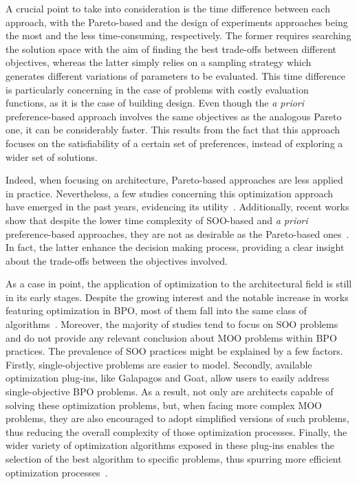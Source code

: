 	A crucial point to take into consideration is the time difference between each approach, with the Pareto-based and the design of experiments approaches being the most and the less time-consuming, respectively. The former requires searching the solution space with the aim of finding the best trade-offs between different objectives, whereas the latter simply relies on a sampling strategy which generates different variations of parameters to be evaluated. This time difference is particularly concerning in the case of problems with costly evaluation functions, as it is the case of building design. Even though the \textit{a priori} preference-based approach involves the same objectives as the analogous Pareto one, it can be considerably faster. This results from the fact that this approach focuses on the satisfiability of a certain set of preferences, instead of exploring a wider set of solutions.
	
	Indeed, when focusing on architecture, Pareto-based approaches are less applied in practice. Nevertheless, a few studies concerning this optimization approach have emerged in the past years, evidencing its utility~\cite{Evins2013,Hamdy2016}. Additionally, recent works show that despite the lower time complexity of \ac{SOO}-based and \textit{a priori} preference-based approaches, they are not as desirable as the Pareto-based ones~\cite{Attia2013,Cichocka2017SURVEY}. In fact, the latter enhance the decision making process, providing a clear insight about the trade-offs between the objectives involved. %

	As a case in point, the application of optimization to the architectural field is still in its early stages. Despite the growing interest and the notable increase in works featuring optimization in \ac{BPO}, most of them fall into the same class of algorithms~\cite{Evins2013,Nguyen2014}. Moreover, the majority of studies tend to focus on \ac{SOO} problems and do not provide any relevant conclusion about \ac{MOO} problems within \ac{BPO} practices. The prevalence of \ac{SOO} practices might be explained by a few factors. Firstly, single-objective problems are easier to model. Secondly, available optimization plug-ins, like Galapagos and Goat, allow users to easily address single-objective \ac{BPO} problems. As a result, not only are architects capable of solving these optimization problems, but, when facing more complex \ac{MOO} problems, they are also encouraged to adopt simplified versions of such problems, thus reducing the overall complexity of those optimization processes. Finally, the wider variety of optimization algorithms exposed in these plug-ins enables the selection of the best algorithm to specific problems, thus spurring more efficient optimization processes~\cite{Wortmann2016BBO}.  
	
